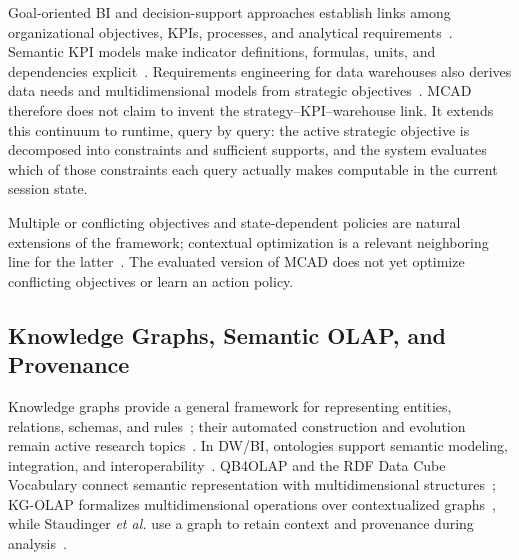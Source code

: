 \documentclass[journal]{IEEEtran}
\begin{document}
Goal-oriented BI and decision-support approaches establish links among organizational objectives, KPIs, processes, and analytical requirements~\cite{Pourshahid2014}. Semantic KPI models make indicator definitions, formulas, units, and dependencies explicit~\cite{MateTrujilloMylopoulos2017,RoldanGarciaEtAl2021,DiamantiniKPISurvey2025}. Requirements engineering for data warehouses also derives data needs and multidimensional models from strategic objectives~\cite{NasiriAhmedWrembelZimanyi2017}. MCAD therefore does not claim to invent the strategy--KPI--warehouse link. It extends this continuum to runtime, query by query: the active strategic objective is decomposed into constraints and sufficient supports, and the system evaluates which of those constraints each query actually makes computable in the current session state.

Multiple or conflicting objectives and state-dependent policies are natural extensions of the framework; contextual optimization is a relevant neighboring line for the latter~\cite{SadanaEJOR2025}. The evaluated version of MCAD does not yet optimize conflicting objectives or learn an action policy.

\subsection{Knowledge Graphs, Semantic OLAP, and Provenance}

Knowledge graphs provide a general framework for representing entities, relations, schemas, and rules~\cite{HoganKGSurvey2021}; their automated construction and evolution remain active research topics~\cite{ZhongKGC2024}. In DW/BI, ontologies support semantic modeling, integration, and interoperability~\cite{AntunesCardosoBarateiro2022}. QB4OLAP and the RDF Data Cube Vocabulary connect semantic representation with multidimensional structures~\cite{Etcheverry2014,W3CDataCube2014}; KG-OLAP formalizes multidimensional operations over contextualized graphs~\cite{SchuetzSerafiniBozzato2021}, while Staudinger \emph{et al.} use a graph to retain context and provenance during analysis~\cite{StaudingerSchuetzSchrefl2025}.
\end{document}
